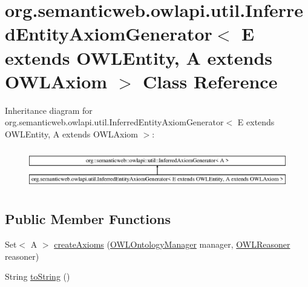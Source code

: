 \hypertarget{classorg_1_1semanticweb_1_1owlapi_1_1util_1_1_inferred_entity_axiom_generator_3_01_e_01extends_0ddbb3a27179f13f242fcbe2b6c7938c1}{\section{org.\-semanticweb.\-owlapi.\-util.\-Inferred\-Entity\-Axiom\-Generator$<$ E extends O\-W\-L\-Entity, A extends O\-W\-L\-Axiom $>$ Class Reference}
\label{classorg_1_1semanticweb_1_1owlapi_1_1util_1_1_inferred_entity_axiom_generator_3_01_e_01extends_0ddbb3a27179f13f242fcbe2b6c7938c1}
}
Inheritance diagram for org.\-semanticweb.\-owlapi.\-util.\-Inferred\-Entity\-Axiom\-Generator$<$ E extends O\-W\-L\-Entity, A extends O\-W\-L\-Axiom $>$\-:\begin{figure}[H]
\begin{center}
\leavevmode
\includegraphics[height=1.797753cm]{classorg_1_1semanticweb_1_1owlapi_1_1util_1_1_inferred_entity_axiom_generator_3_01_e_01extends_0ddbb3a27179f13f242fcbe2b6c7938c1}
\end{center}
\end{figure}
\subsection*{Public Member Functions}
\begin{DoxyCompactItemize}
\item 
Set$<$ A $>$ \hyperlink{classorg_1_1semanticweb_1_1owlapi_1_1util_1_1_inferred_entity_axiom_generator_3_01_e_01extends_0ddbb3a27179f13f242fcbe2b6c7938c1_a6953a04d82a2b04be1d5a089c2d087b1}{create\-Axioms} (\hyperlink{interfaceorg_1_1semanticweb_1_1owlapi_1_1model_1_1_o_w_l_ontology_manager}{O\-W\-L\-Ontology\-Manager} manager, \hyperlink{interfaceorg_1_1semanticweb_1_1owlapi_1_1reasoner_1_1_o_w_l_reasoner}{O\-W\-L\-Reasoner} reasoner)
\item 
String \hyperlink{classorg_1_1semanticweb_1_1owlapi_1_1util_1_1_inferred_entity_axiom_generator_3_01_e_01extends_0ddbb3a27179f13f242fcbe2b6c7938c1_a408ff99d4bb831ae68155530c4f0cd3f}{to\-String} ()
\end{DoxyCompactItemize}
